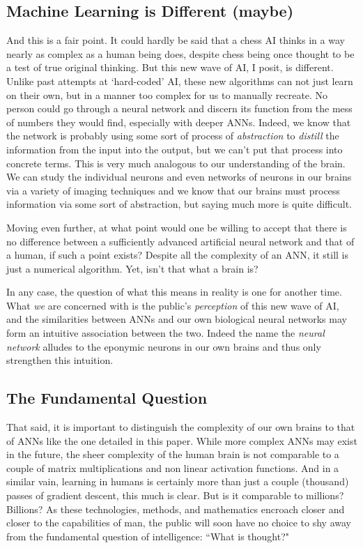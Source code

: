 \documentclass{article}
\begin{document}
\subsection{Machine Learning is Different (maybe)}
And this is a fair point. It could hardly be said that a chess AI thinks in a way nearly as complex as a human being does, despite chess being once thought to be a test of true original thinking. But this new wave of AI, I posit, is different. Unlike past attempts at `hard-coded' AI, these new algorithms can not just learn on their own, but in a manner too complex for us to manually recreate. No person could go through a neural network and discern its function from the mess of numbers they would find, especially with deeper ANNs. Indeed, we know that the network is probably using some sort of process of \textit{abstraction} to \textit{distill} the information from the input into the output, but we can't put that process into concrete terms. This is very much analogous to our understanding of the brain. We can study the individual neurons and even networks of neurons in our brains via a variety of imaging techniques and we know that our brains must process information via some sort of abstraction, but saying much more is quite difficult.

Moving even further, at what point would one be willing to accept that there is no difference between a sufficiently advanced artificial neural network and that of a human, if such a point exists? Despite all the complexity of an ANN, it still is just a numerical algorithm. Yet, isn't that what a brain is?

In any case, the question of what this means in reality is one for another time. What \textit{we} are concerned with is the public's \textit{perception} of this new wave of AI, and the similarities between ANNs and our own biological neural networks may form an intuitive association between the two. Indeed the name the \textit{neural network} alludes to the eponymic neurons in our own brains and thus only strengthen this intuition.

\subsection{The Fundamental Question}
That said, it is important to distinguish the complexity of our own brains to that of ANNs like the one detailed in this paper. While more complex ANNs may exist in the future, the sheer complexity of the human brain is not comparable to a couple of matrix multiplications and non linear activation functions. And in a similar vain, learning in humans is certainly more than just a couple (thousand) passes of gradient descent, this much is clear. But is it comparable to millions? Billions? As these technologies, methods, and mathematics encroach closer and closer to the capabilities of man, the public will soon have no choice to shy away from the fundamental question of intelligence: ``What is thought?"
\end{document}
